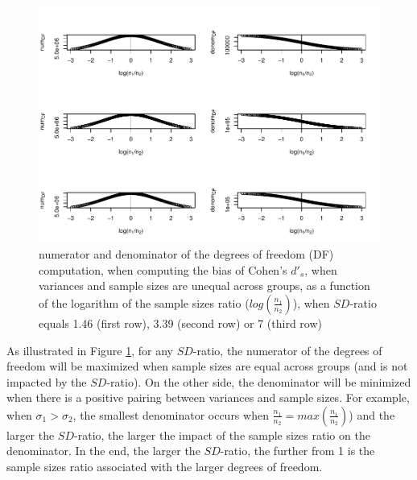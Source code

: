 \documentclass[
  man]{apa6}
\begin{document}
\begin{figure}
\centering
\includegraphics{Theoretical-Bias-of-all-estimators-as-a-function-of-population-parameters_files/figure-latex/biascohendprimehetunbalnumanddenomdf-1.pdf}
\caption{\label{fig:biascohendprimehetunbalnumanddenomdf}numerator and denominator of the degrees of freedom (DF) computation, when computing the bias of Cohen's \(d'_s\), when variances and sample sizes are unequal across groups, as a function of the logarithm of the sample sizes ratio (\(log \left( \frac{n_1}{n_2} \right)\)), when \(SD\)-ratio equals 1.46 (first row), 3.39 (second row) or 7 (third row)}
\end{figure}

As illustrated in Figure \ref{fig:biascohendprimehetunbalnumanddenomdf}, for any \(SD\)-ratio, the numerator of the degrees of freedom will be maximized when sample sizes are equal across groups (and is not impacted by the \(SD\)-ratio). On the other side, the denominator will be minimized when there is a positive pairing between variances and sample sizes. For example, when \(\sigma_1>\sigma_2\), the smallest denominator occurs when \(\frac{n_1}{n_2}=max(\frac{n_1}{n_2})\)) and the larger the \(SD\)-ratio, the larger the impact of the sample sizes ratio on the denominator. In the end, the larger the \(SD\)-ratio, the further from 1 is the sample sizes ratio associated with the larger degrees of freedom.
\end{document}
